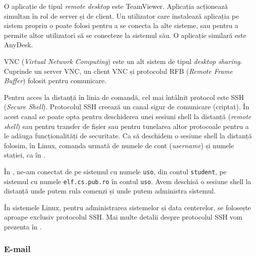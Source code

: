 O aplicație de tipul \textit{remote desktop} este TeamViewer.
Aplicația acționează simultan în rol de server și de client.
Un utilizator care instalează aplicația pe sistem propriu o poate folosi pentru a se conecta la alte sisteme, sau pentru a permite altor utilizatori să se conecteze la sistemul său.
O aplicație similară este AnyDesk.

VNC  (\textit{Virtual Network Computing}) este un alt sistem de tipul \textit{desktop sharing}.
Cuprinde un server VNC, un client VNC și protocolul RFB  (\textit{Remote Frame Buffer}) folosit pentru comunicare.

Pentru acces la distanță în linia de comandă, cel mai întâlnit protocol este SSH (\textit{Secure Shell}).
Protocolul SSH creează un canal sigur de comunicare (criptat).
În acest canal se poate opta pentru deschiderea unei sesiuni shell la distanță (\textit{remote shell}) sau pentru transfer de fișier sau pentru tunelarea altor protocoale pentru a le adăuga funcționalități de securitate.
Ca să deschidem o sesiune shell la distanță folosim, în Linux, comanda  urmată de numele de cont (\textit{username}) și numele stației, ca în .


În , ne-am conectat de pe sistemul cu numele \texttt{uso}, din contul \texttt{student}, pe sistemul cu numele \texttt{elf.cs.pub.ro} în contul \texttt{uso}.
Avem deschisă o sesiune shell la distanță unde putem rula comenzi și unde putem administra sistemul.

În sistemele Linux, pentru administrarea sistemelor și data centerelor, se folosește aproape exclusiv protocolul SSH.
Mai multe detalii despre protocolul SSH vom prezenta în .

\subsubsection{E-mail}
\label{sec:net:apps:other:e-mail}

